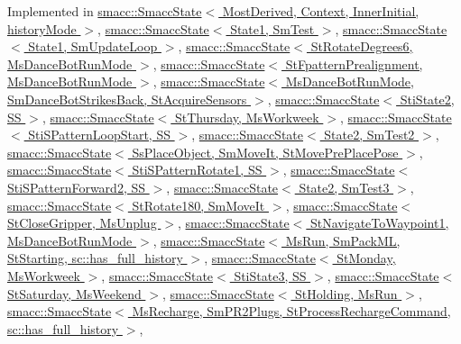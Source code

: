 Implemented in \hyperlink{classsmacc_1_1SmaccState_afc39f8e0ca4001b2159a100da2fccd0e}{smacc\+::\+Smacc\+State$<$ Most\+Derived, Context, Inner\+Initial, history\+Mode $>$}, \hyperlink{classsmacc_1_1SmaccState_afc39f8e0ca4001b2159a100da2fccd0e}{smacc\+::\+Smacc\+State$<$ State1, Sm\+Test $>$}, \hyperlink{classsmacc_1_1SmaccState_afc39f8e0ca4001b2159a100da2fccd0e}{smacc\+::\+Smacc\+State$<$ State1, Sm\+Update\+Loop $>$}, \hyperlink{classsmacc_1_1SmaccState_afc39f8e0ca4001b2159a100da2fccd0e}{smacc\+::\+Smacc\+State$<$ St\+Rotate\+Degrees6, Ms\+Dance\+Bot\+Run\+Mode $>$}, \hyperlink{classsmacc_1_1SmaccState_afc39f8e0ca4001b2159a100da2fccd0e}{smacc\+::\+Smacc\+State$<$ St\+Fpattern\+Prealignment, Ms\+Dance\+Bot\+Run\+Mode $>$}, \hyperlink{classsmacc_1_1SmaccState_afc39f8e0ca4001b2159a100da2fccd0e}{smacc\+::\+Smacc\+State$<$ Ms\+Dance\+Bot\+Run\+Mode, Sm\+Dance\+Bot\+Strikes\+Back, St\+Acquire\+Sensors $>$}, \hyperlink{classsmacc_1_1SmaccState_afc39f8e0ca4001b2159a100da2fccd0e}{smacc\+::\+Smacc\+State$<$ Sti\+State2, S\+S $>$}, \hyperlink{classsmacc_1_1SmaccState_afc39f8e0ca4001b2159a100da2fccd0e}{smacc\+::\+Smacc\+State$<$ St\+Thursday, Ms\+Workweek $>$}, \hyperlink{classsmacc_1_1SmaccState_afc39f8e0ca4001b2159a100da2fccd0e}{smacc\+::\+Smacc\+State$<$ Sti\+S\+Pattern\+Loop\+Start, S\+S $>$}, \hyperlink{classsmacc_1_1SmaccState_afc39f8e0ca4001b2159a100da2fccd0e}{smacc\+::\+Smacc\+State$<$ State2, Sm\+Test2 $>$}, \hyperlink{classsmacc_1_1SmaccState_afc39f8e0ca4001b2159a100da2fccd0e}{smacc\+::\+Smacc\+State$<$ Ss\+Place\+Object, Sm\+Move\+It, St\+Move\+Pre\+Place\+Pose $>$}, \hyperlink{classsmacc_1_1SmaccState_afc39f8e0ca4001b2159a100da2fccd0e}{smacc\+::\+Smacc\+State$<$ Sti\+S\+Pattern\+Rotate1, S\+S $>$}, \hyperlink{classsmacc_1_1SmaccState_afc39f8e0ca4001b2159a100da2fccd0e}{smacc\+::\+Smacc\+State$<$ Sti\+S\+Pattern\+Forward2, S\+S $>$}, \hyperlink{classsmacc_1_1SmaccState_afc39f8e0ca4001b2159a100da2fccd0e}{smacc\+::\+Smacc\+State$<$ State2, Sm\+Test3 $>$}, \hyperlink{classsmacc_1_1SmaccState_afc39f8e0ca4001b2159a100da2fccd0e}{smacc\+::\+Smacc\+State$<$ St\+Rotate180, Sm\+Move\+It $>$}, \hyperlink{classsmacc_1_1SmaccState_afc39f8e0ca4001b2159a100da2fccd0e}{smacc\+::\+Smacc\+State$<$ St\+Close\+Gripper, Ms\+Unplug $>$}, \hyperlink{classsmacc_1_1SmaccState_afc39f8e0ca4001b2159a100da2fccd0e}{smacc\+::\+Smacc\+State$<$ St\+Navigate\+To\+Waypoint1, Ms\+Dance\+Bot\+Run\+Mode $>$}, \hyperlink{classsmacc_1_1SmaccState_afc39f8e0ca4001b2159a100da2fccd0e}{smacc\+::\+Smacc\+State$<$ Ms\+Run, Sm\+Pack\+M\+L, St\+Starting, sc\+::has\+\_\+full\+\_\+history $>$}, \hyperlink{classsmacc_1_1SmaccState_afc39f8e0ca4001b2159a100da2fccd0e}{smacc\+::\+Smacc\+State$<$ St\+Monday, Ms\+Workweek $>$}, \hyperlink{classsmacc_1_1SmaccState_afc39f8e0ca4001b2159a100da2fccd0e}{smacc\+::\+Smacc\+State$<$ Sti\+State3, S\+S $>$}, \hyperlink{classsmacc_1_1SmaccState_afc39f8e0ca4001b2159a100da2fccd0e}{smacc\+::\+Smacc\+State$<$ St\+Saturday, Ms\+Weekend $>$}, \hyperlink{classsmacc_1_1SmaccState_afc39f8e0ca4001b2159a100da2fccd0e}{smacc\+::\+Smacc\+State$<$ St\+Holding, Ms\+Run $>$}, \hyperlink{classsmacc_1_1SmaccState_afc39f8e0ca4001b2159a100da2fccd0e}{smacc\+::\+Smacc\+State$<$ Ms\+Recharge, Sm\+P\+R2\+Plugs, St\+Process\+Recharge\+Command, sc\+::has\+\_\+full\+\_\+history $>$}, 